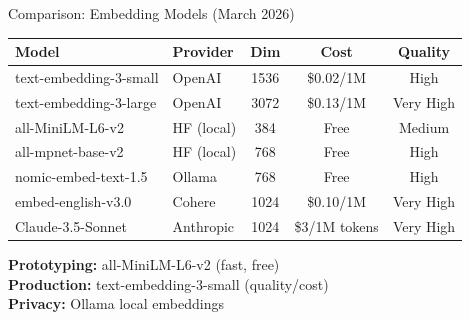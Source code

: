 \documentclass[aspectratio=169,11pt]{beamer}
\begin{document}
\begin{frame}{Comparison: Embedding Models (March 2026)}
  \small
  \begin{tabular}{llccc}
    \toprule
    \textbf{Model} & \textbf{Provider} & \textbf{Dim} & \textbf{Cost} & \textbf{Quality} \\
    \midrule
    text-embedding-3-small & OpenAI & 1536 & \$0.02/1M & High \\
    text-embedding-3-large & OpenAI & 3072 & \$0.13/1M & Very High \\
    all-MiniLM-L6-v2 & HF (local) & 384 & Free & Medium \\
    all-mpnet-base-v2 & HF (local) & 768 & Free & High \\
    nomic-embed-text-1.5 & Ollama & 768 & Free & High \\
    embed-english-v3.0 & Cohere & 1024 & \$0.10/1M & Very High \\
    Claude-3.5-Sonnet & Anthropic & 1024 & \$3/1M tokens & Very High \\
    \bottomrule
  \end{tabular}

  \vspace{0.05cm}
  \begin{tipbox}
    \textbf{Prototyping:} all-MiniLM-L6-v2 (fast, free)\\
    \textbf{Production:} text-embedding-3-small (quality/cost)\\
    \textbf{Privacy:} Ollama local embeddings
  \end{tipbox}
\end{frame}
\end{document}
